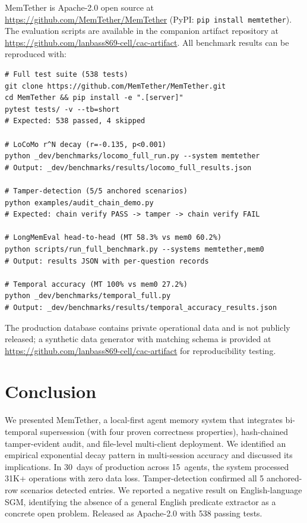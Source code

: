 \documentclass{article}
\begin{document}
MemTether is Apache-2.0 open source at \url{https://github.com/MemTether/MemTether} (PyPI: \texttt{pip install memtether}). The evaluation scripts are available in the companion artifact repository at \url{https://github.com/lanbass869-cell/cac-artifact}. All benchmark results can be reproduced with:

\begin{verbatim}
# Full test suite (538 tests)
git clone https://github.com/MemTether/MemTether.git
cd MemTether && pip install -e ".[server]"
pytest tests/ -v --tb=short
# Expected: 538 passed, 4 skipped

# LoCoMo r^N decay (r=-0.135, p<0.001)
python _dev/benchmarks/locomo_full_run.py --system memtether
# Output: _dev/benchmarks/results/locomo_full_results.json

# Tamper-detection (5/5 anchored scenarios)
python examples/audit_chain_demo.py
# Expected: chain verify PASS -> tamper -> chain verify FAIL

# LongMemEval head-to-head (MT 58.3% vs mem0 60.2%)
python scripts/run_full_benchmark.py --systems memtether,mem0
# Output: results JSON with per-question records

# Temporal accuracy (MT 100% vs mem0 27.2%)
python _dev/benchmarks/temporal_full.py
# Output: _dev/benchmarks/results/temporal_accuracy_results.json
\end{verbatim}

The production database contains private operational data and is not publicly released; a synthetic data generator with matching schema is provided at \url{https://github.com/lanbass869-cell/cac-artifact} for reproducibility testing.
\section{Conclusion}
We presented MemTether, a local-first agent memory system that integrates bi-temporal supersession (with four proven correctness properties), hash-chained tamper-evident audit, and file-level multi-client deployment. We identified an empirical exponential decay pattern in multi-session accuracy and discussed its implications. In 30~days of production across 15~agents, the system processed 31K+ operations with zero data loss. Tamper-detection confirmed all 5 anchored-row scenarios detected entries. We reported a negative result on English-language SGM, identifying the absence of a general English predicate extractor as a concrete open problem. Released as Apache-2.0 with 538 passing tests.
\end{document}
